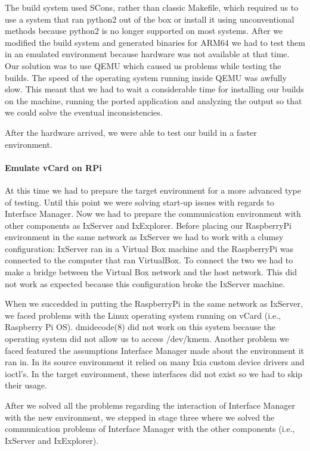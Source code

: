 The build system used SCons, rather than classic Makefile, which required us to
use a system that ran python2 out of the box or install it using unconventional
methods because python2 is no longer supported on most systems. After we
modified the build system and generated binaries for ARM64 we had to test them
in an emulated environment because hardware was not available at that time. Our
solution was to use QEMU which caused us problems while testing the builds.
The speed of the operating system running inside QEMU was awfully slow. This
meant that we had to wait a considerable time for installing our builds on the
machine, running the ported application and analyzing the output so that we
could solve the eventual inconsistencies.

After the hardware arrived, we were able to test our build in a faster
environment.

\paragraph{Emulate vCard on RPi}

At this time we had to prepare the target environment for a more advanced
type of testing. Until this point we were solving start-up issues with regards
to Interface Manager. Now we had to prepare the communication environment with
other components as IxServer and IxExplorer. Before placing our RaspberryPi
environment in the same network as IxServer we had to work with a clumsy
configuration: IxServer ran in a Virtual Box machine and the RaspberryPi was
connected to the computer that ran VirtualBox. To connect the two we had to make
a bridge between the Virtual Box network and the host network. This did not work
as expected because this configuration broke the IxServer machine.

When we succedded in putting the RaspberryPi in the same network as IxServer,
we faced problems with the Linux operating system running on vCard (i.e.,
Raspberry Pi OS). dmidecode(8) did not work on this system because the operating
system did not allow us to access /dev/kmem. Another problem we faced featured
the assumptions Interface Manager made about the environment it ran in. In its
source environment it relied on many Ixia custom device drivers and ioctl's.
In the target environment, these interfaces did not exist so we had to
skip their usage.

After we solved all the problems regarding the interaction of Interface Manager
with the new environment, we stepped in stage three where we solved the
communication problems of Interface Manager with the other components (i.e.,
IxServer and IxExplorer).

